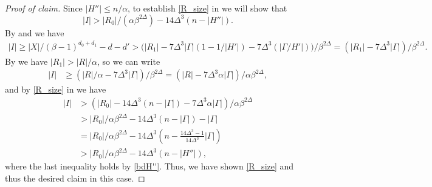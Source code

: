 \documentclass{article}
\theoremstyle{definition}
\newenvironment{subproof}[1][\proofname]{%
  \renewcommand{\qedsymbol}{$\blacksquare$}%
  \begin{proof}[#1]%
}{%
  \end{proof}%
}
\begin{document}
\begin{subproof}[Proof of claim]
Since $|H''|\leq n/\alpha$, to establish \cref{R_size} in  we will show that \[|I|>|R_0|/(\alpha\beta^{2\Delta}) - 14\Delta^3 (n-|H''|).\]
By  and   we have 
\begin{align*}
    |I|\geq |X|/(\beta-1)^{d_0+d_1} -d -d'
    > \big(|R_1|-7\Delta^3|\Gamma|(1-1/|H'|) -7\Delta^3(|\Gamma/H'|)\big)/\beta^{2\Delta} = (|R_1|-7\Delta^3|\Gamma|)/\beta^{2\Delta} .
\end{align*}
By  we have $|R_1| >|R|/\alpha$, so we can write 
\begin{align*}
    |I|& \ge (|R|/\alpha - 7\Delta^3|\Gamma|)/\beta^{2\Delta}= (|R| - 7\Delta^3\alpha|\Gamma|)/\alpha\beta^{2\Delta},
\end{align*}
and by \cref{R_size} in  we have
\begin{align*}
    |I| &>(|R_0| -14\Delta^3 (n-|\Gamma|) - 7\Delta^3\alpha|\Gamma|)/\alpha\beta^{2\Delta}
\\&> |R_0|/\alpha\beta^{2\Delta} - 14\Delta^3(n-|\Gamma|)-|\Gamma|
\\& = |R_0|/\alpha\beta^{2\Delta} - 14\Delta^3\left(n-\frac{14\Delta^3-1}{14\Delta^3}|\Gamma|\right)
\\ &> |R_0|/\alpha\beta^{2\Delta} - 14\Delta^3(n-|H''|),
\end{align*}
where the last inequality holds by \cref{bdH''}. Thus, we have shown \cref{R_size} and thus the desired claim in this case. 



\end{subproof}
\end{document}
